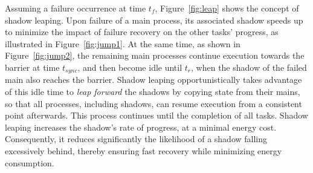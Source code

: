 Assuming a failure occurrence at time $t_f$, Figure~\ref{fig:leap} shows the concept of shadow leaping. 
Upon failure of a main process, its associated shadow speeds up to minimize the impact of failure recovery on the other tasks' progress, as illustrated in Figure~\ref{fig:jump1}. 
At the same time, as shown in Figure~\ref{fig:jump2}, the remaining main processes continue execution towards the barrier at time $t_{sync}$, and then become idle until $t_r$, when the shadow of the failed main also reaches the barrier. %
Shadow leaping opportunistically takes advantage of this idle time to {\it leap forward} the shadows by copying state from their mains, so that  
all processes, including shadows, can resume execution from a consistent point afterwards. This process continues until the completion of all tasks. Shadow leaping increases the shadow's rate of progress, at a minimal energy cost. Consequently, it reduces significantly the likelihood of a shadow falling excessively behind, thereby ensuring fast recovery while minimizing energy consumption.




